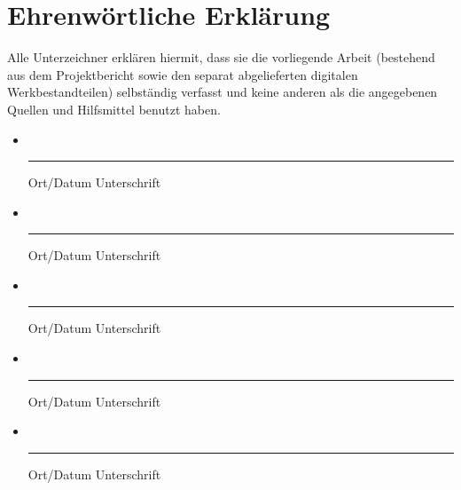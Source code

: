 \newcommand{\signentry}[1]{%
\item #1\\[1cm]
\mbox{}\newline\vspace{0.6cm}%
\parbox{13cm}{%
\mbox{}\centering\hrule\medskip Ort/Datum\hspace{5cm}%
Unterschrift}}
\flushleft
\pagestyle{empty}
\enlargethispage{2.5cm}
\section*{Ehrenwörtliche Erklärung}
Alle Unterzeichner erklären hiermit, dass sie die vorliegende Arbeit (bestehend aus dem Projektbericht sowie den separat abgelieferten digitalen Werkbestandteilen) selbständig verfasst und keine anderen als die angegebenen Quellen und Hilfsmittel benutzt haben.\\[2ex]

\begin{itemize}
\signentry{\AName}
\signentry{\BName}
\signentry{\CName}
\signentry{\DName}
\signentry{\EName}

\end{itemize}
